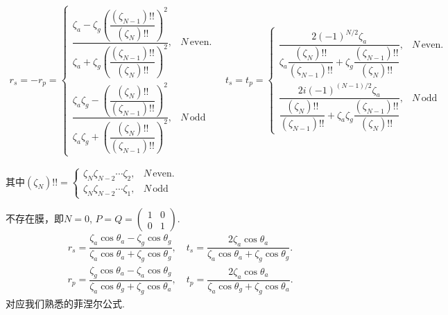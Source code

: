 \begin{exbox}
	\begin{align*}
		r_s = -r_p =
		\begin{cases}
			\dfrac{\zeta_a - \zeta_g \left(\dfrac{(\zeta_{N-1})!!}{(\zeta_{N})!!}\right)^2}{\zeta_a + \zeta_g \left(\dfrac{(\zeta_{N-1})!!}{(\zeta_{N})!!}\right)^2}, & N\,\text{even}. \\[24pt]
			\dfrac{\zeta_a\zeta_g - \left(\dfrac{(\zeta_{N})!!}{(\zeta_{N-1})!!}\right)^2}{\zeta_a\zeta_g + \left(\dfrac{(\zeta_{N})!!}{(\zeta_{N-1})!!}\right)^2},   & N\,\text{odd}
		\end{cases}\quad
		t_s = t_p =
		\begin{cases}
			\dfrac{2(-1)^{N/2}\zeta_a}{\zeta_a \dfrac{(\zeta_{N})!!}{(\zeta_{N-1})!!} + \zeta_g \dfrac{(\zeta_{N-1})!!}{(\zeta_{N})!!}},         & N\,\text{even}. \\[24pt]
			\dfrac{2    i(-1)^{(N-1)/2}\zeta_a}{\dfrac{(\zeta_{N})!!}{(\zeta_{N-1})!!} + \zeta_a\zeta_g \dfrac{(\zeta_{N-1})!!}{(\zeta_{N})!!}}, & N\,\text{odd}
		\end{cases}
	\end{align*}

	其中\((\zeta_{N})!! =
	\begin{cases}
		\zeta_{N}\zeta_{N-2}\cdots\zeta_2, & N\,\text{even}. \\
		\zeta_{N}\zeta_{N-2}\cdots\zeta_1, & N\,\text{odd}
	\end{cases}\)
\end{exbox}

\begin{exbox}
	不存在膜，即\(N = 0\), \(P = Q =
	\begin{pmatrix}
		1 & 0 \\
		0 & 1
	\end{pmatrix}\).
	\begin{align*}
		r_s = \dfrac{\zeta_a \cos\theta_a - \zeta_g \cos\theta_g}{\zeta_a \cos\theta_a + \zeta_g \cos\theta_g},\quad t_s = \dfrac{2\zeta_a \cos\theta_a}{\zeta_a \cos\theta_a + \zeta_g \cos\theta_g}.
	\end{align*}
	\begin{align*}
		r_p = \dfrac{\zeta_g \cos\theta_a - \zeta_a \cos\theta_g}{\zeta_a \cos\theta_g + \zeta_g \cos\theta_a},\quad t_p = \dfrac{2\zeta_a \cos\theta_a}{\zeta_a \cos\theta_g + \zeta_g \cos\theta_a}.
	\end{align*}
	对应我们熟悉的菲涅尔公式.
\end{exbox}


